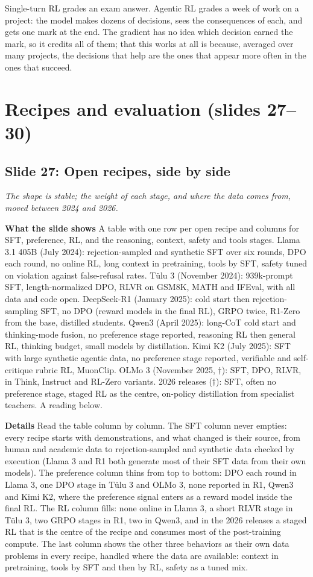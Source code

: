 \documentclass[11pt,letterpaper]{article}
\newcommand{\setstage}[1]{\colorlet{stagec}{#1}}
\newcommand{\slide}[3]{%
  \subsection[Slide #1: #2]{Slide #1: #2}%
  {\color{muted}\itshape #3\par}\medskip}
\newcommand{\para}[1]{\medskip\noindent\textbf{#1}\quad}
\newenvironment{intuition}{\begin{tcolorbox}[intuitionbox]}{\end{tcolorbox}}
\begin{document}
\begin{intuition}
Single-turn RL grades an exam answer. Agentic RL grades a week of work on a project: the model makes dozens of decisions, sees the consequences of each, and gets one mark at the end. The gradient has no idea which decision earned the mark, so it credits all of them; that this works at all is because, averaged over many projects, the decisions that help are the ones that appear more often in the ones that succeed.
\end{intuition}

\clearpage
\setstage{trn}
\section{Recipes and evaluation (slides 27--30)}

\slide{27}{Open recipes, side by side}{The shape is stable; the weight of each stage, and where the data comes from, moved between 2024 and 2026.}

\para{What the slide shows} A table with one row per open recipe and columns for SFT, preference, RL, and the reasoning, context, safety and tools stages. Llama 3.1 405B (July 2024): rejection-sampled and synthetic SFT over six rounds, DPO each round, no online RL, long context in pretraining, tools by SFT, safety tuned on violation against false-refusal rates. Tülu 3 (November 2024): 939k-prompt SFT, length-normalized DPO, RLVR on GSM8K, MATH and IFEval, with all data and code open. DeepSeek-R1 (January 2025): cold start then rejection-sampling SFT, no DPO (reward models in the final RL), GRPO twice, R1-Zero from the base, distilled students. Qwen3 (April 2025): long-CoT cold start and thinking-mode fusion, no preference stage reported, reasoning RL then general RL, thinking budget, small models by distillation. Kimi K2 (July 2025): SFT with large synthetic agentic data, no preference stage reported, verifiable and self-critique rubric RL, MuonClip. OLMo 3 (November 2025, $\dagger$): SFT, DPO, RLVR, in Think, Instruct and RL-Zero variants. 2026 releases ($\dagger$): SFT, often no preference stage, staged RL as the centre, on-policy distillation from specialist teachers. A reading below.

\para{Details} Read the table column by column. The SFT column never empties: every recipe starts with demonstrations, and what changed is their source, from human and academic data to rejection-sampled and synthetic data checked by execution (Llama 3 and R1 both generate most of their SFT data from their own models). The preference column thins from top to bottom: DPO each round in Llama 3, one DPO stage in Tülu 3 and OLMo 3, none reported in R1, Qwen3 and Kimi K2, where the preference signal enters as a reward model inside the final RL. The RL column fills: none online in Llama 3, a short RLVR stage in Tülu 3, two GRPO stages in R1, two in Qwen3, and in the 2026 releases a staged RL that is the centre of the recipe and consumes most of the post-training compute. The last column shows the other three behaviors as their own data problems in every recipe, handled where the data are available: context in pretraining, tools by SFT and then by RL, safety as a tuned mix.
\end{document}
